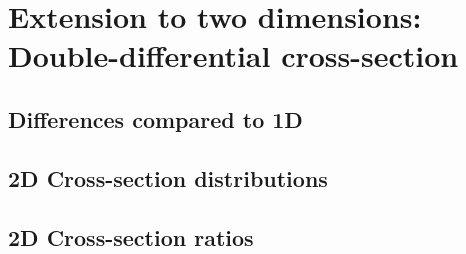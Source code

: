 \chapter{Extension to two dimensions: Double-differential cross-section}

\label{ch:analysis2D}

\section{Differences compared to 1D}
\section{2D Cross-section distributions}
\section{2D Cross-section ratios}



